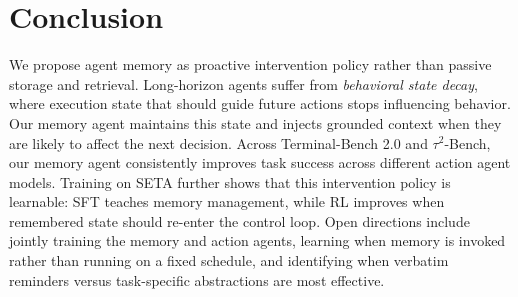 \section{Conclusion}
\label{section:conclusion}

We propose agent memory as proactive intervention policy rather than passive storage and retrieval. Long-horizon agents suffer from \emph{behavioral state decay}, where execution state that should guide future actions stops influencing behavior. Our memory agent maintains this state and injects grounded context when they are likely to affect the next decision. Across Terminal-Bench 2.0 and $\tau^2$-Bench, our memory agent consistently improves task success across different action agent models. Training on SETA further shows that this intervention policy is learnable: SFT teaches memory management, while RL improves when remembered state should re-enter the control loop. Open directions include jointly training the memory and action agents, learning when memory is invoked rather than running on a fixed schedule, and identifying when verbatim reminders versus task-specific abstractions are most effective.